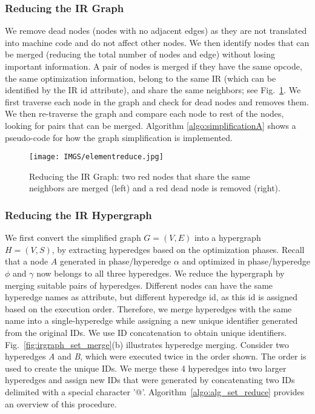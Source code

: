 \documentclass[runningheads]{llncs}
\begin{document}
\subsubsection{Reducing the IR Graph }\label{sec:reducegraph} 
We remove dead nodes (nodes with no adjacent edges) as they are not translated into machine code and do not affect other nodes. We then identify nodes that can be merged (reducing the total number of nodes and edge) without losing important information. A pair of nodes is merged if they have the same opcode, the same optimization information, belong to the same IR (which can be identified by the IR id attribute), and share the same neighbors; see Fig.~\ref{fig:node_reduce}.
We first traverse each node in the graph and check for dead nodes and removes them. We then re-traverse the graph and compare each node to rest of the nodes, looking for pairs that can be merged. Algorithm \ref{algo:simplificationA} shows a pseudo-code for how the graph simplification is implemented.

\begin{figure}
    \begin{center}
    \texttt{[image: IMGS/elementreduce.jpg]}
    \end{center}
    \caption{Reducing the IR Graph: two red nodes that share the same neighbors are merged (left) and a red dead node is removed (right). }
    \label{fig:node_reduce}
\end{figure}

\subsubsection{Reducing the IR Hypergraph}\label{sec:reducehypergraph} We first convert the simplified graph $G=(V,E)$ into a hypergraph $H=(V,S)$, by extracting hyperedges based on the optimization phases. Recall that a node $A$  generated in phase/hyperedge $\alpha$ and optimized in phase/hyperedge $\phi$ and $\gamma$ now belongs to all three hyperedges. We reduce the hypergraph by merging suitable pairs of hyperedges. Different nodes can have the same hyperedge names as attribute, but different hyperedge id, as this id is assigned based on the execution order. Therefore, we merge hyperedges with the same name into a single-hyperedge while assigning a new unique identifier generated from the original IDs. We use ID concatenation to obtain unique identifiers. Fig.~\ref{fig:irgraph_set_merge}(b) illustrates hyperedge merging. Consider two hyperedges \textit{A} and \textit{B}, which were executed twice in the order shown. The order is used to create the unique IDs. We merge these 4 hyperedges into two larger hyperedges and assign new IDs that were generated by concatenating two IDs delimited with a special character '@'. Algorithm~\ref{algo:alg_set_reduce} provides an overview of this procedure.
 
\end{document}
